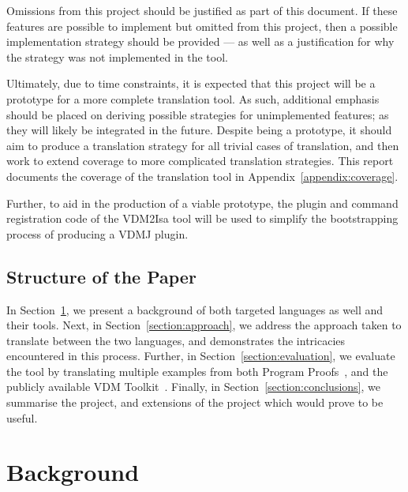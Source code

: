 \documentclass{entcs}
\newcommand{\lfcomment}[1]{\ifthenelse { \boolean{showComments} } {\textcolor{red}{LF:~#1}} { } } %
\begin{document}
Omissions from this project should be justified as part of this document. If these features are possible to implement but omitted from this project, then a possible implementation strategy should be provided --- as well as a justification for why the strategy was not implemented in the tool. 

Ultimately, due to time constraints, it is expected that this project will be a prototype for a more complete translation tool. As such, additional emphasis should be placed on deriving possible strategies for unimplemented features; as they will likely be integrated in the future. Despite being a prototype, it should aim to produce a translation strategy for all trivial cases of translation, and then work to extend coverage to more complicated translation strategies. This report documents the coverage of the translation tool in Appendix~\ref{appendix:coverage}.

Further, to aid in the production of a viable prototype, the plugin and command registration code of the VDM2Isa tool will be used to simplify the bootstrapping process of producing a VDMJ plugin.

\subsection{Structure of the Paper}

In Section~\ref{section:background}, we present a background of both targeted languages as well and their tools. Next, in Section~\ref{section:approach}, we address the approach taken to translate between the two languages, and demonstrates the intricacies encountered in this process. Further, in Section~\ref{section:evaluation}, we evaluate the tool by translating multiple examples from both Program Proofs~\cite{ProgProofsCodeExamples}, and the publicly available VDM Toolkit~\cite{VDMToolkit}. Finally, in Section~\ref{section:conclusions}, we summarise the project, and extensions of the project which would prove to be useful.


\section{Background}\label{section:background}
\end{document}
